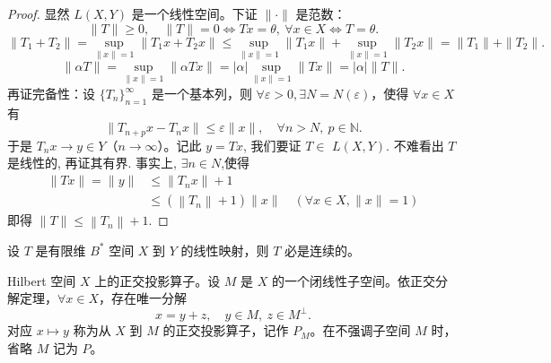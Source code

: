 \documentclass[lang=cn,newtx,10pt,scheme=chinese,thmcnt=chapter]{elegantbook}
\begin{document}
	\begin{proof}
		显然 $L({X}, {Y})$ 是一个线性空间。下证 $\|\cdot\|$ 是范数：  
		\[
		\|T\| \geq 0, \quad \|T\| = 0 \Longleftrightarrow T x = \theta, \ \forall x \in {X} \Longleftrightarrow T = \theta.
		\]
		\[
		\|T_1 + T_2\| = \sup_{\|x\|=1} \|T_1 x + T_2 x\| \leq \sup_{\|x\|=1} \|T_1 x\| + \sup_{\|x\|=1} \|T_2 x\| = \|T_1\| + \|T_2\|.
		\]
		\[
		\|\alpha T\| = \sup_{\|x\|=1} \|\alpha T x\| = |\alpha| \sup_{\|x\|=1} \|T x\| = |\alpha| \|T\|.
		\]
		再证完备性：设 $\{T_n\}_{n=1}^\infty$ 是一个基本列，则 $\forall \varepsilon > 0, \exists N = N(\varepsilon)$，使得 $\forall x \in {X}$ 有  
		\[
		\|T_{n+p} x - T_n x\| \leq \varepsilon \|x\|, \quad \forall n > N, \ p \in \mathbb{N}.
		\]
		于是 $T_n x \to y \in {Y}$（$n \to \infty$）。记此 $y=T x$, 我们要证 $T \in$ ${L} ( {X} , {Y} )$. 不难看出 $T$ 是线性的, 再证其有界. 事实上, $\exists n \in N$,使得
		\begin{equation*}
			\begin{aligned}
				\|T x\|=\|y\| & \leqslant\left\|T_n x\right\|+1 \\
				& \leqslant\left(\left\|T_n\right\|+1\right)\|x\| \quad(\forall x \in {X} ,\|x\|=1)
			\end{aligned}
		\end{equation*}
		即得 $\|T\| \leqslant\left\|T_n\right\|+1$.
	\end{proof}
	
	\begin{example}
		设 $T$ 是有限维 $B^*$ 空间 ${X}$ 到 ${Y}$ 的线性映射，则 $T$ 必是连续的。
	\end{example}
	
	\begin{example}
		Hilbert 空间 ${X}$ 上的正交投影算子。设 $M$ 是 ${X}$ 的一个闭线性子空间。依正交分解定理，$\forall x \in {X}$，存在唯一分解  
		\[
		x = y + z, \quad y \in M, \ z \in M^\perp.
		\]
		对应 $x \mapsto y$ 称为从 ${X}$ 到 $M$ 的正交投影算子，记作 $P_M$。在不强调子空间 $M$ 时，省略 $M$ 记为 $P$。
	\end{example}
	
\end{document}
